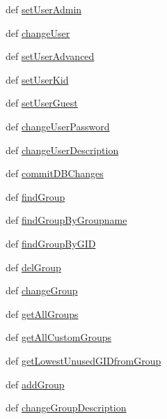\begin{DoxyCompactItemize}
\item 
def \hyperlink{classdb__layer_1_1_database_a03795c597d3a3ca0ef5d7c73299f8421}{set\-User\-Admin}
\item 
def \hyperlink{classdb__layer_1_1_database_a6b55a92453cf88fd95b0e6b565663bbc}{change\-User}
\item 
def \hyperlink{classdb__layer_1_1_database_a203864bb4a53dfb89f57c23392559b46}{set\-User\-Advanced}
\item 
def \hyperlink{classdb__layer_1_1_database_a03a583931163ed9bac45c5b05e4bf69f}{set\-User\-Kid}
\item 
def \hyperlink{classdb__layer_1_1_database_ab86b18a8ab851b48703101ab53af6f8b}{set\-User\-Guest}
\item 
def \hyperlink{classdb__layer_1_1_database_a2faddc3de17c5f91a96d835339e5b187}{change\-User\-Password}
\item 
def \hyperlink{classdb__layer_1_1_database_ad49eca83ffa1263e355f5757e9b4d814}{change\-User\-Description}
\item 
def \hyperlink{classdb__layer_1_1_database_a3cdf214f598de4b4c5d08e5a1f7c218b}{commit\-D\-B\-Changes}
\item 
def \hyperlink{classdb__layer_1_1_database_a39d62bdcc06c57e3a02aa86c31a45f8d}{find\-Group}
\item 
def \hyperlink{classdb__layer_1_1_database_a20c7dd43617755b5ebaf0e1d22a4a2f8}{find\-Group\-By\-Groupname}
\item 
def \hyperlink{classdb__layer_1_1_database_a16008b08c96fa493d7ee12b2a7a5b181}{find\-Group\-By\-G\-I\-D}
\item 
def \hyperlink{classdb__layer_1_1_database_a8470bd9042a562ac6205dc6edcb374ea}{del\-Group}
\item 
def \hyperlink{classdb__layer_1_1_database_a36251bcd67a2b86157830f7c4df7c35d}{change\-Group}
\item 
def \hyperlink{classdb__layer_1_1_database_aec26922467f83a27ddc41b583f0f1cb0}{get\-All\-Groups}
\item 
def \hyperlink{classdb__layer_1_1_database_a22ed5c7f36dbb61e6f60c4040987bf55}{get\-All\-Custom\-Groups}
\item 
def \hyperlink{classdb__layer_1_1_database_a98fa2d3a8377bca1fe5f2d2946ef2929}{get\-Lowest\-Unused\-G\-I\-Dfrom\-Group}
\item 
def \hyperlink{classdb__layer_1_1_database_a472b95b106b4fe0185582d99f36edb85}{add\-Group}
\item 
def \hyperlink{classdb__layer_1_1_database_ab3e162f3cda68dacdfaa3de68e300567}{change\-Group\-Description}

\end{DoxyCompactItemize}
